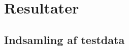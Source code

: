 \section{Resultater}

\subsection{Indsamling af testdata}

\begin{comment}




Vi tog i alt 407 fotografier med to digitalkameraer: 236 med et Canon og 171 med et Olympus. Et eksempel på et fotografi ses i Figur 1.%

FIGUR 1: EKSEMPEL PÅ FOTOGRAFI AF BIL MED NUMMERPLADE


Da vi bl.a. havde planer om udarbejdelse af en histogrambaseret metode til identificering af nummerplader (se afsnit \ref{histo}), holdt vi de to fotografisæt adskilte. På denne måde ville det f.eks. være muligt for os at teste om skift fra et kamera til et andet, vil give ændrede resultater. Billederne blev navngivet i vores database, så det, i deres filnavn, indgik om billedet forestillede en bil set forfra eller bagfra samt hvilken nummerplade bilen på nummerpladen havde. Derudover udarbejdede vi et mindre program som hjalp os til at identificere nummerpladens fire hjørnekoordinater og indskrive disse i filnavnet. Denne sidste tilføjelse ville hjælpe os i testfasen, til at undersøge om de nummerpladekandidater vores system ville udvælge er de korrekte.



\end{comment}

